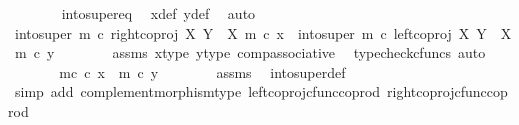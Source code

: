 \begin{isabellebody}
\ \ \ \ \ \ \isamarkupfalse%
\ into{\isacharunderscore}{\kern0pt}super{\isacharunderscore}{\kern0pt}eq\ \isamarkupfalse%
\ x{\isacharunderscore}{\kern0pt}def\ y{\isacharunderscore}{\kern0pt}def\ \isamarkupfalse%
\ auto\isanewline
\ \ \ \ \isamarkupfalse%
\ \isamarkupfalse%
\ {\isachardoublequoteopen}{\isacharparenleft}{\kern0pt}into{\isacharunderscore}{\kern0pt}super\ m\ {\isasymcirc}\isactrlsub c\ right{\isacharunderscore}{\kern0pt}coproj\ X\ {\isacharparenleft}{\kern0pt}Y\ {\isasymsetminus}\ {\isacharparenleft}{\kern0pt}X{\isacharcomma}{\kern0pt}\ m{\isacharparenright}{\kern0pt}{\isacharparenright}{\kern0pt}{\isacharparenright}{\kern0pt}\ {\isasymcirc}\isactrlsub c\ x{\isacharprime}{\kern0pt}\ {\isacharequal}{\kern0pt}\ {\isacharparenleft}{\kern0pt}into{\isacharunderscore}{\kern0pt}super\ m\ {\isasymcirc}\isactrlsub c\ left{\isacharunderscore}{\kern0pt}coproj\ X\ {\isacharparenleft}{\kern0pt}Y\ {\isasymsetminus}\ {\isacharparenleft}{\kern0pt}X{\isacharcomma}{\kern0pt}\ m{\isacharparenright}{\kern0pt}{\isacharparenright}{\kern0pt}{\isacharparenright}{\kern0pt}\ {\isasymcirc}\isactrlsub c\ y{\isacharprime}{\kern0pt}{\isachardoublequoteclose}\isanewline
\ \ \ \ \ \ \isamarkupfalse%
\ assms\ x{\isacharprime}{\kern0pt}{\isacharunderscore}{\kern0pt}type\ y{\isacharprime}{\kern0pt}{\isacharunderscore}{\kern0pt}type\ comp{\isacharunderscore}{\kern0pt}associative{}\ \isamarkupfalse%
\ {\isacharparenleft}{\kern0pt}typecheck{\isacharunderscore}{\kern0pt}cfuncs{\isacharcomma}{\kern0pt}\ auto{\isacharparenright}{\kern0pt}\isanewline
\ \ \ \ \isamarkupfalse%
\ \isamarkupfalse%
\ {\isachardoublequoteopen}m\isactrlsup c\ {\isasymcirc}\isactrlsub c\ x{\isacharprime}{\kern0pt}\ {\isacharequal}{\kern0pt}\ m\ {\isasymcirc}\isactrlsub c\ y{\isacharprime}{\kern0pt}{\isachardoublequoteclose}\isanewline
\ \ \ \ \ \ \isamarkupfalse%
\ assms\ \isamarkupfalse%
\ into{\isacharunderscore}{\kern0pt}super{\isacharunderscore}{\kern0pt}def\isanewline
\ \ \ \ \ \ \isamarkupfalse%
\ {\isacharparenleft}{\kern0pt}simp\ add{\isacharcolon}{\kern0pt}\ complement{\isacharunderscore}{\kern0pt}morphism{\isacharunderscore}{\kern0pt}type\ left{\isacharunderscore}{\kern0pt}coproj{\isacharunderscore}{\kern0pt}cfunc{\isacharunderscore}{\kern0pt}coprod\ right{\isacharunderscore}{\kern0pt}coproj{\isacharunderscore}{\kern0pt}cfunc{\isacharunderscore}{\kern0pt}coprod{\isacharparenright}{\kern0pt}\isanewline

\end{isabellebody}
